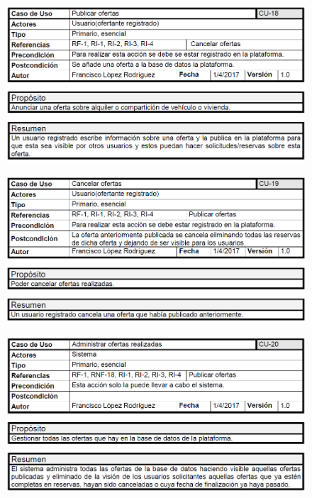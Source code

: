 	\begin{figure}[h!]
		\centering
		\includegraphics[width=0.9\linewidth]{img/casos/ofertas/publicar_ofertas}
		\label{fig:criticasypuntuaciones}
	\end{figure}
\clearpage
	\begin{figure}[h!]
		\centering
		\includegraphics[width=0.9\linewidth]{img/casos/ofertas/cancelar_ofertas}
		\label{fig:criticasypuntuaciones}
	\end{figure}
	\begin{figure}[h!]
		\centering
		\includegraphics[width=0.9\linewidth]{img/casos/ofertas/administrar_ofertas}
		\label{fig:criticasypuntuaciones}
	\end{figure}



